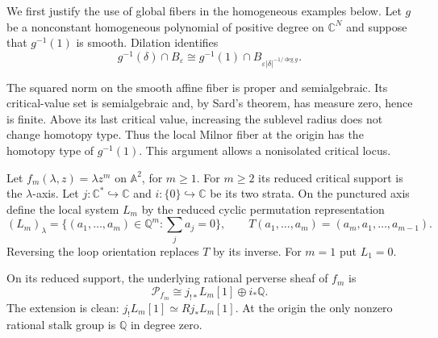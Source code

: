 We first justify the use of global fibers in the homogeneous
examples below. Let $g$ be a nonconstant homogeneous polynomial
of positive degree on $\mathbb C^N$ and suppose that
$g^{-1}(1)$ is smooth. Dilation identifies
\[
 g^{-1}(\delta)\cap B_\varepsilon
       \cong g^{-1}(1)\cap B_{\varepsilon|\delta|^{-1/\deg g}}.
\]

The squared norm on the smooth affine fiber is proper and
semialgebraic. Its critical-value set is semialgebraic and,
by Sard's theorem, has measure zero, hence is finite.
Above its last critical value, increasing the sublevel radius
does not change homotopy type. Thus the local Milnor fiber at
the origin has the homotopy type of $g^{-1}(1)$.
This argument allows a nonisolated critical locus.

Let $f_m(\lambda,z)=\lambda z^m$ on $\mathbb A^2$, for
$m\ge1$. For $m\ge2$ its reduced critical support is the
$\lambda$-axis. Let
$j:\mathbb C^*\hookrightarrow\mathbb C$ and
$i:\{0\}\hookrightarrow\mathbb C$ be its two strata.
On the punctured axis define the local system $L_m$ by the
reduced cyclic permutation representation
\begin{equation}\label{vc:vic:eq:cyclic-system}
 (L_m)_\lambda=
 \bigl\{(a_1,\ldots,a_m)\in\mathbb Q^m:
                         \textstyle\sum_j a_j=0\bigr\},
 \qquad T(a_1,\ldots,a_m)=(a_m,a_1,\ldots,a_{m-1}).
\end{equation}
Reversing the loop orientation replaces $T$ by its inverse.
For $m=1$ put $L_1=0$.

\begin{theorem}\label{vc:vic:thm:monomial}
On its reduced support, the underlying rational perverse sheaf
of $f_m$ is
\begin{equation}\label{vc:vic:eq:monomial-splitting}
 \mathcal P_{f_m}\cong j_{!*}L_m[1]\oplus i_*\mathbb Q.
\end{equation}
The extension is clean:
$j_!L_m[1]\simeq Rj_*L_m[1]$.
At the origin the only nonzero rational stalk group is
$\mathbb Q$ in degree zero.
\end{theorem}

